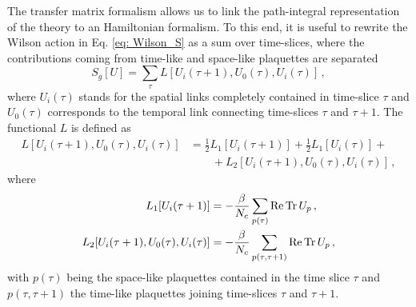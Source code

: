 \documentclass{article}
\begin{document}
The transfer matrix formalism allows us to link the path-integral representation of the theory to an Hamiltonian formalism. To this end, it is useful to rewrite the Wilson action in Eq. \eqref{eq: Wilson_S} as a sum over time-slices, where the contributions coming from time-like and space-like plaquettes are separated \cite{Montvay:1994cy}
\begin{equation}\label{eq: action time-slices}
    S_g[U] = \sum_\tau L[U_i(\tau+1), U_0(\tau), U_i(\tau)] \, ,
\end{equation}
where $U_i(\tau)$ stands for the spatial links completely contained in time-slice $\tau$ and $U_0(\tau)$ corresponds to the temporal link connecting time-slices $\tau$ and $\tau+1$. The functional $L$ is defined as
\begin{equation}
    \begin{aligned}
        L[U_i(\tau+1), U_0(\tau), U_i(\tau)] &= \frac{1}{2} L_1[U_i(\tau+1)] + \frac{1}{2} L_1[U_i(\tau)] + \\
        &\qquad +L_2[U_i(\tau+1), U_0(\tau), U_i(\tau)] \, , 
    \end{aligned}
\end{equation}
where
\begin{align}
    L_1[U_i(\tau+1)] &= -\frac{\beta}{N_c} \sum_{p(\tau)} \Re \Tr U_p \, , \\
    L_2[U_i(\tau+1), U_0(\tau), U_i(\tau)] &= -\frac{\beta}{N_c} \sum_{p(\tau, \tau+1)} \Re \Tr U_p \, ,
\end{align}
with $p(\tau)$ being the space-like plaquettes contained in the time slice $\tau$ and $p(\tau, \tau+1)$ the time-like plaquettes joining time-slices $\tau$ and $\tau+1$. 
\end{document}
